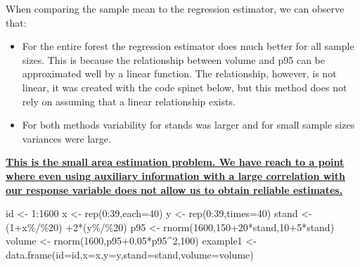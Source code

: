 \documentclass[
  letterpaper,
  DIV=11,
  numbers=noendperiod]{scrartcl}
\newenvironment{Shaded}{\begin{snugshade}}{\end{snugshade}}
\newcommand{\AttributeTok}[1]{\textcolor[rgb]{0.40,0.45,0.13}{#1}}
\newcommand{\DecValTok}[1]{\textcolor[rgb]{0.68,0.00,0.00}{#1}}
\newcommand{\FloatTok}[1]{\textcolor[rgb]{0.68,0.00,0.00}{#1}}
\newcommand{\FunctionTok}[1]{\textcolor[rgb]{0.28,0.35,0.67}{#1}}
\newcommand{\NormalTok}[1]{\textcolor[rgb]{0.00,0.23,0.31}{#1}}
\newcommand{\OtherTok}[1]{\textcolor[rgb]{0.00,0.23,0.31}{#1}}
\newcommand{\SpecialCharTok}[1]{\textcolor[rgb]{0.37,0.37,0.37}{#1}}
\begin{document}
When comparing the sample mean to the regression estimator, we can
observe that:

\begin{itemize}
\item
  For the entire forest the regression estimator does much better for
  all sample sizes. This is because the relationship between volume and
  p95 can be approximated well by a linear function. The relationship,
  however, is not linear, it was created with the code spinet below, but
  this method does not rely on assuming that a linear relationship
  exists.
\item
  For both methods variability for stands was larger and for small
  sample sizes variances were large.
\end{itemize}

\ul{\textbf{This is the small area estimation problem. We have reach to
a point where even using auxiliary information with a large correlation
with our response variable does not allow us to obtain reliable
estimates.}}

\begin{Shaded}
\begin{Highlighting}[]
\NormalTok{id }\OtherTok{\textless{}{-}} \DecValTok{1}\SpecialCharTok{:}\DecValTok{1600}
\NormalTok{x }\OtherTok{\textless{}{-}} \FunctionTok{rep}\NormalTok{(}\DecValTok{0}\SpecialCharTok{:}\DecValTok{39}\NormalTok{,}\AttributeTok{each=}\DecValTok{40}\NormalTok{)}
\NormalTok{y }\OtherTok{\textless{}{-}} \FunctionTok{rep}\NormalTok{(}\DecValTok{0}\SpecialCharTok{:}\DecValTok{39}\NormalTok{,}\AttributeTok{times=}\DecValTok{40}\NormalTok{)}
\NormalTok{stand }\OtherTok{\textless{}{-}}\NormalTok{ (}\DecValTok{1}\SpecialCharTok{+}\NormalTok{x}\SpecialCharTok{\%/\%}\DecValTok{20}\NormalTok{) }\SpecialCharTok{+}\DecValTok{2}\SpecialCharTok{*}\NormalTok{(y}\SpecialCharTok{\%/\%}\DecValTok{20}\NormalTok{)}
\NormalTok{p95 }\OtherTok{\textless{}{-}} \FunctionTok{rnorm}\NormalTok{(}\DecValTok{1600}\NormalTok{,}\DecValTok{150}\SpecialCharTok{+}\DecValTok{20}\SpecialCharTok{*}\NormalTok{stand,}\DecValTok{10}\SpecialCharTok{+}\DecValTok{5}\SpecialCharTok{*}\NormalTok{stand)}
\NormalTok{volume }\OtherTok{\textless{}{-}} \FunctionTok{rnorm}\NormalTok{(}\DecValTok{1600}\NormalTok{,p95}\FloatTok{+0.05}\SpecialCharTok{*}\NormalTok{p95}\SpecialCharTok{\^{}}\DecValTok{2}\NormalTok{,}\DecValTok{100}\NormalTok{)}
\NormalTok{example1 }\OtherTok{\textless{}{-}} \FunctionTok{data.frame}\NormalTok{(}\AttributeTok{id=}\NormalTok{id,}\AttributeTok{x=}\NormalTok{x,}\AttributeTok{y=}\NormalTok{y,}\AttributeTok{stand=}\NormalTok{stand,}\AttributeTok{volume=}\NormalTok{volume)}
\end{Highlighting}
\end{Shaded}
\end{document}
